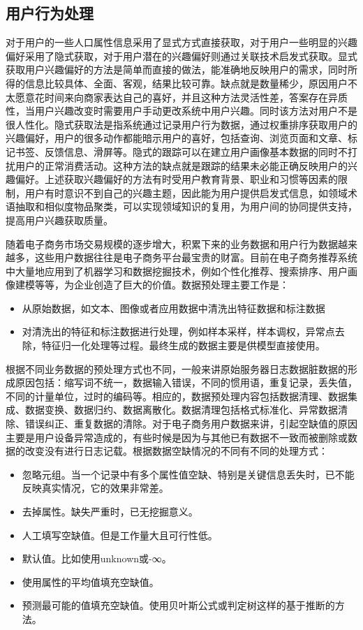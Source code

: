 		\subsection{用户行为处理}
		对于用户的一些人口属性信息采用了显式方式直接获取，对于用户一些明显的兴趣偏好采用了隐式获取，对于用户潜在的兴趣偏好则通过关联技术启发式获取。显式获取用户兴趣偏好的方法是简单而直接的做法，能准确地反映用户的需求，同时所得的信息比较具体、全面、客观，结果比较可靠。缺点就是数量稀少，原因用户不太愿意花时间来向商家表达自己的喜好，并且这种方法灵活性差，答案存在异质性，当用户兴趣改变时需要用户手动更改系统中用户兴趣。同时该方法对用户不是很人性化。隐式获取法是指系统通过记录用户行为数据，通过权重排序获取用户的兴趣偏好，用户的很多动作都能暗示用户的喜好，包括查询、浏览页面和文章、标记书签、反馈信息、滑屏等。隐式的跟踪可以在建立用户画像基本数据的同时不打扰用户的正常消费活动。这种方法的缺点就是跟踪的结果未必能正确反映用户的兴趣偏好。上述获取兴趣偏好的方法有时受用户教育背景、职业和习惯等因素的限制，用户有时意识不到自己的兴趣主题，因此能为用户提供启发式信息，如领域术语抽取和相似度物品聚类，可以实现领域知识的复用，为用户间的协同提供支持，提高用户兴趣获取质量。
		
		随着电子商务市场交易规模的逐步增大，积累下来的业务数据和用户行为数据越来越多，这些用户数据往往是电子商务平台最宝贵的财富。目前在电子商务推荐系统中大量地应用到了机器学习和数据挖掘技术，例如个性化推荐、搜索排序、用户画像建模等等，为企业创造了巨大的价值。数据预处理主要工作是：
		\begin{itemize}
		\item 从原始数据，如文本、图像或者应用数据中清洗出特征数据和标注数据
		\item 对清洗出的特征和标注数据进行处理，例如样本采样，样本调权，异常点去除，特征归一化处理等过程。最终生成的数据主要是供模型直接使用。
		\end{itemize}

		根据不同业务数据的预处理方式也不同，一般来讲原始服务器日志数据脏数据的形成原因包括：缩写词不统一，数据输入错误，不同的惯用语，重复记录，丢失值，不同的计量单位，过时的编码等。相应的，数据预处理内容包括数据清理、数据集成、数据变换、数据归约、数据离散化。数据清理包括格式标准化、异常数据清除、错误纠正、重复数据的清除。对于电子商务用户数据来讲，引起空缺值的原因主要是用户设备异常造成的，有些时候是因为与其他已有数据不一致而被删除或数据的改变没有进行日志记载。根据数据空缺情况的不同有不同的处理方式：
		\begin{itemize}
		\item 忽略元组。当一个记录中有多个属性值空缺、特别是关键信息丢失时，已不能反映真实情况，它的效果非常差。
		\item 去掉属性。缺失严重时，已无挖掘意义。
		\item 人工填写空缺值。但是工作量大且可行性低。
		\item 默认值。比如使用unknown或-∞。
		\item 使用属性的平均值填充空缺值。
		\item 预测最可能的值填充空缺值。使用贝叶斯公式或判定树这样的基于推断的方法。
		\end{itemize}

